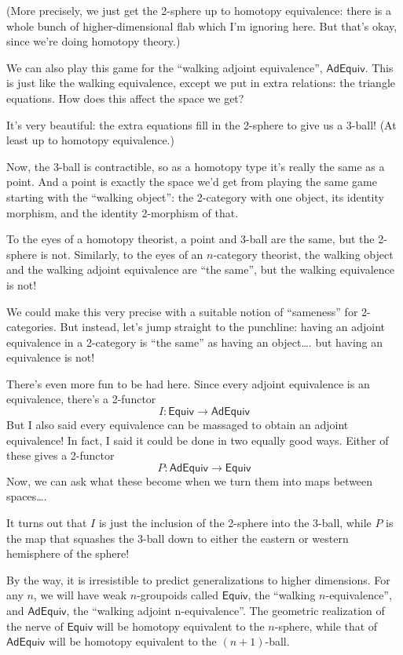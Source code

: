 \documentclass{article}
\begin{document}
(More precisely, we just get the 2-sphere up to homotopy equivalence:
there is a whole bunch of higher-dimensional flab which I'm ignoring
here. But that's okay, since we're doing homotopy theory.)

We can also play this game for the ``walking adjoint equivalence'',
\(\mathsf{AdEquiv}\). This is just like the walking equivalence, except
we put in extra relations: the triangle equations. How does this affect
the space we get?

It's very beautiful: the extra equations fill in the 2-sphere to give us
a 3-ball! (At least up to homotopy equivalence.)

Now, the 3-ball is contractible, so as a homotopy type it's really the
same as a point. And a point is exactly the space we'd get from playing
the same game starting with the ``walking object'': the 2-category with
one object, its identity morphism, and the identity 2-morphism of that.

To the eyes of a homotopy theorist, a point and 3-ball are the same, but
the 2-sphere is not. Similarly, to the eyes of an \(n\)-category
theorist, the walking object and the walking adjoint equivalence are
``the same'', but the walking equivalence is not!

We could make this very precise with a suitable notion of ``sameness''
for 2-categories. But instead, let's jump straight to the punchline:
having an adjoint equivalence in a 2-category is ``the same'' as having
an object\ldots. but having an equivalence is not!

There's even more fun to be had here. Since every adjoint equivalence is
an equivalence, there's a 2-functor
\[I\colon \mathsf{Equiv} \to \mathsf{AdEquiv}\] But I also said every
equivalence can be massaged to obtain an adjoint equivalence! In fact, I
said it could be done in two equally good ways. Either of these gives a
2-functor \[P\colon \mathsf{AdEquiv} \to \mathsf{Equiv}\] Now, we can
ask what these become when we turn them into maps between spaces\ldots.

It turns out that \(I\) is just the inclusion of the 2-sphere into the
3-ball, while \(P\) is the map that squashes the 3-ball down to either
the eastern or western hemisphere of the sphere!

By the way, it is irresistible to predict generalizations to higher
dimensions. For any \(n\), we will have weak \(n\)-groupoids called
\(\mathsf{Equiv}\), the ``walking \(n\)-equivalence'', and
\(\mathsf{AdEquiv}\), the ``walking adjoint n-equivalence''. The
geometric realization of the nerve of \(\mathsf{Equiv}\) will be
homotopy equivalent to the \(n\)-sphere, while that of
\(\mathsf{AdEquiv}\) will be homotopy equivalent to the \((n+1)\)-ball.
\end{document}
